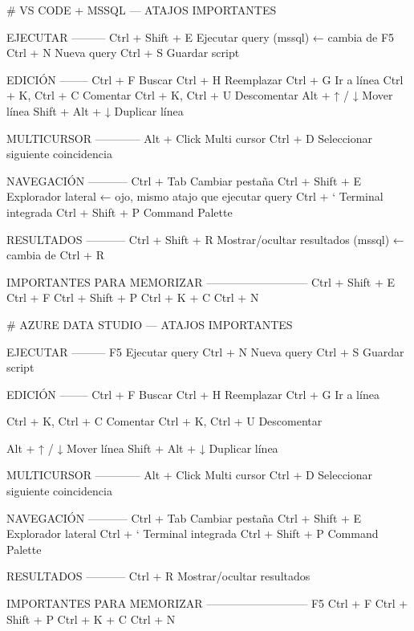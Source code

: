 # VS CODE + MSSQL — ATAJOS IMPORTANTES

EJECUTAR
---------
Ctrl + Shift + E   Ejecutar query (mssql)  ← cambia de F5
Ctrl + N           Nueva query
Ctrl + S           Guardar script

EDICIÓN
--------
Ctrl + F           Buscar
Ctrl + H           Reemplazar
Ctrl + G           Ir a línea
Ctrl + K, Ctrl + C     Comentar
Ctrl + K, Ctrl + U     Descomentar
Alt + ↑ / ↓        Mover línea
Shift + Alt + ↓    Duplicar línea

MULTICURSOR
------------
Alt + Click        Multi cursor
Ctrl + D           Seleccionar siguiente coincidencia

NAVEGACIÓN
-----------
Ctrl + Tab         Cambiar pestaña
Ctrl + Shift + E   Explorador lateral  ← ojo, mismo atajo que ejecutar query
Ctrl + `           Terminal integrada
Ctrl + Shift + P   Command Palette

RESULTADOS
-----------
Ctrl + Shift + R   Mostrar/ocultar resultados (mssql)  ← cambia de Ctrl + R

IMPORTANTES PARA MEMORIZAR
---------------------------
Ctrl + Shift + E
Ctrl + F
Ctrl + Shift + P
Ctrl + K + C
Ctrl + N



# AZURE DATA STUDIO — ATAJOS IMPORTANTES

EJECUTAR
---------
F5                 Ejecutar query
Ctrl + N           Nueva query
Ctrl + S           Guardar script

EDICIÓN
--------
Ctrl + F           Buscar
Ctrl + H           Reemplazar
Ctrl + G           Ir a línea

Ctrl + K, Ctrl + C     Comentar
Ctrl + K, Ctrl + U     Descomentar

Alt + ↑ / ↓        Mover línea
Shift + Alt + ↓    Duplicar línea

MULTICURSOR
------------
Alt + Click        Multi cursor
Ctrl + D           Seleccionar siguiente coincidencia

NAVEGACIÓN
-----------
Ctrl + Tab         Cambiar pestaña
Ctrl + Shift + E   Explorador lateral
Ctrl + `           Terminal integrada
Ctrl + Shift + P   Command Palette

RESULTADOS
-----------
Ctrl + R           Mostrar/ocultar resultados

IMPORTANTES PARA MEMORIZAR
---------------------------
F5
Ctrl + F
Ctrl + Shift + P
Ctrl + K + C
Ctrl + N




